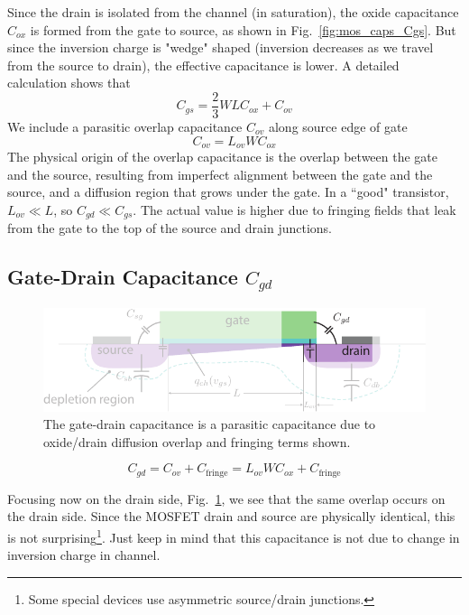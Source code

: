 Since the drain is isolated from the channel (in saturation), the oxide capacitance $C_{ox}$ is formed from the gate to source, as shown in Fig.~\ref{fig:mos_caps_Cgs}.  But since the inversion charge is "wedge" shaped (inversion decreases as we travel from the source to drain), the effective capacitance is lower.  A detailed calculation shows that
%
\begin{equation}
	C_{gs} = \frac{2}{3} W L C_{ox} + C_{ov} 
\end{equation} 
% 
We include a parasitic overlap capacitance $C_{ov}$ along source edge of gate 
%
\begin{equation}
	C_{ov} = L_{ov} W C_{ox}
\end{equation}
%
The physical origin of the overlap capacitance is the overlap between the gate and the source, resulting from imperfect alignment between the gate and the source, and a diffusion region that grows under the gate.   In a ``good" transistor, $L_{ov} \ll L$, so $C_{gd} \ll C_{gs}$.  The actual value is higher due to fringing fields that leak from the gate to the top of the source and drain junctions.
 




\subsection{Gate-Drain Capacitance $C_{gd}$}

\begin{figure}[b]
\begin{center}
\includegraphics[width=.75\columnwidth]{mos_caps_Cgd}
\end{center}
\caption{The gate-drain capacitance is a parasitic capacitance due to oxide/drain diffusion overlap and fringing terms shown.} \label{fig:mos_caps_Cgd}
\end{figure}
\begin{equation}
	C_{gd} = C_{ov} + C_{\text{fringe}} = L_{ov} W C_{ox} + C_{\text{fringe}}
\end{equation}

Focusing now on the drain side, Fig.~\ref{fig:mos_caps_Cgd}, we see that the same overlap occurs on the drain side.  Since the MOSFET drain and source are physically identical, this is not surprising\footnote{Some special devices use asymmetric source/drain junctions.}.  Just keep in mind that this capacitance is not due to change in inversion charge in channel.


